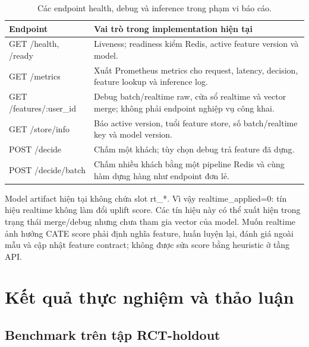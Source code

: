 \documentclass[11pt,a4paper]{article}
\DeclareRobustCommand{\code}[1]{{\small\texttt{#1}}}
\def\code#1{#1}%
\begin{document}
\begin{table}[H]
\centering
\small
\begin{tabularx}{\textwidth}{>{\raggedright\arraybackslash}p{3.5cm}X}
\toprule
\textbf{Endpoint} & \textbf{Vai trò trong implementation hiện tại} \\
\midrule
\code{GET /health}, \code{/ready} & Liveness; readiness kiểm Redis, active feature version và model. \\
\code{GET /metrics} & Xuất Prometheus metrics cho request, latency, decision, feature lookup và inference log. \\
\code{GET /features/:user\_id} & Debug batch/realtime raw, cửa sổ realtime và vector merge; không phải endpoint nghiệp vụ công khai. \\
\code{GET /store/info} & Báo active version, tuổi feature store, số batch/realtime key và model version. \\
\code{POST /decide} & Chấm một khách; tùy chọn debug trả feature đã dựng. \\
\code{POST /decide/batch} & Chấm nhiều khách bằng một pipeline Redis và cùng hàm dựng hàng như endpoint đơn lẻ. \\
\bottomrule
\end{tabularx}
\caption{Các endpoint health, debug và inference trong phạm vi báo cáo.}
\end{table}

Model artifact hiện tại không chứa slot \code{rt\_*}. Vì vậy
\code{realtime\_applied=0}: tín hiệu realtime không làm đổi uplift score.
Các tín hiệu này có thể xuất hiện trong trạng thái merge/debug nhưng chưa
tham gia vector của model. Muốn realtime ảnh hưởng CATE score phải định nghĩa
feature, huấn luyện lại, đánh giá ngoài mẫu và cập nhật feature contract;
không được sửa score bằng heuristic ở tầng API.

\section{Kết quả thực nghiệm và thảo luận}

\subsection{Benchmark trên tập RCT-holdout}
\end{document}
